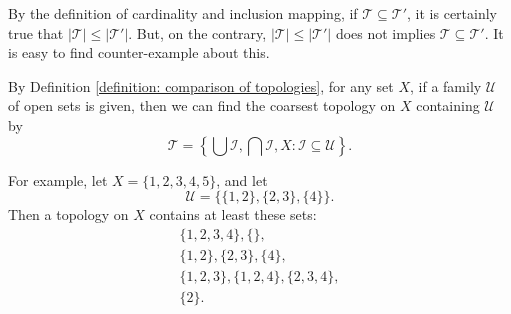 \begin{note}
	By the definition of cardinality and inclusion mapping, if $\mathcal T \subseteq \mathcal T'$, it is certainly true that $| \mathcal T | \le | \mathcal T' |$. But, on the contrary, $| \mathcal T | \le |\mathcal T'|$ does not implies $\mathcal T \subseteq \mathcal T'$. It is easy to find counter-example about this.
\end{note}


\begin{example}
	By Definition \ref{definition: comparison of topologies}, for any set $X$, if a family $\mathcal U$ of open sets is given, then we can find the coarsest topology on $X$ containing $\mathcal U$ by
	$$
	\mathcal T = \left\{ \bigcup \mathcal I, \bigcap \mathcal I, X : \mathcal I \subseteq \mathcal U \right\}.
	$$
	
	For example, let $X = \{1,2,3,4,5\}$, and let
	$$
	\mathcal U = \{\{1,2\}, \{2,3\}, \{4\}\}.
	$$
	Then a topology on $X$ contains at least these sets:
	$$
	\begin{matrix}
		\{1,2,3, 4\}, \{\}, \\
		\{1,2\}, \{2,3\}, \{4\}, \\
		\{1,2,3\}, \{1,2,4\}, \{2,3,4\}, \\
		\{2\}.
	\end{matrix}
	$$
\end{example}


\begin{definition}
	\label{}
\end{definition}



























%